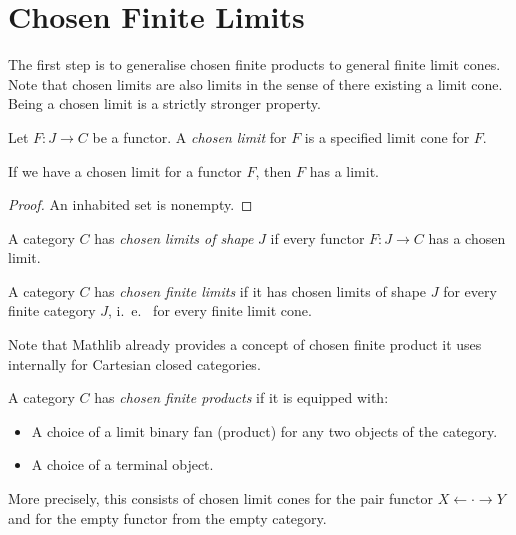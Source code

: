 \section{Chosen Finite Limits}

The first step is to generalise chosen finite products to general finite limit cones. Note that chosen limits are also limits in the sense of there existing a limit cone. Being a chosen limit is a strictly stronger property.

\begin{definition}
  \label{def:chosen-limit}
  \leanok
Let $F : J \to C$ be a functor. A \emph{chosen limit} for $F$ is a specified limit cone for $F$.
\end{definition}

\begin{proposition}
\label{prop:chosen-limit-implies-limit}
\leanok
{}
If we have a chosen limit for a functor $F$, then $F$ has a limit.
\end{proposition}

\begin{proof}
  \leanok
  An inhabited set is nonempty.
\end{proof}

\begin{definition}
  \label{def:chosen-limits-of-shape}
  \leanok
A category $C$ has \emph{chosen limits of shape} $J$ if every functor $F : J \to C$ has a chosen limit.
\end{definition}

\begin{definition}
\label{def:chosen-finite-limits}
\leanok
A category $C$ has \emph{chosen finite limits} if it has chosen limits of shape $J$ for every finite category $J$, i.~e.~ for every finite limit cone.
\end{definition}

Note that Mathlib already provides a concept of chosen finite product it uses internally for Cartesian closed categories.

\begin{definition}
\label{def:chosen-finite-products}
\mathlibok
A category $C$ has \emph{chosen finite products} if it is equipped with:
\begin{itemize}
\item A choice of a limit binary fan (product) for any two objects of the category.
\item A choice of a terminal object.
\end{itemize}
More precisely, this consists of chosen limit cones for the pair functor $X \leftarrow \cdot \rightarrow Y$ and for the empty functor from the empty category.
\end{definition}

